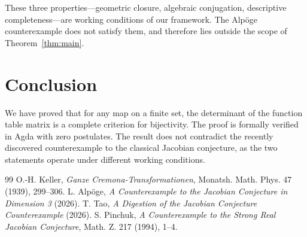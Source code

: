 \documentclass[a4paper,11pt]{article}
\theoremstyle{definition}
\theoremstyle{remark}
\begin{document}
These three properties---geometric closure, algebraic conjugation,
descriptive completeness---are working conditions of our framework.
The Alp\"{o}ge counterexample does not satisfy them, and therefore
lies outside the scope of Theorem~\ref{thm:main}.

\section{Conclusion}

We have proved that for any map on a finite set, the determinant of the
function table matrix is a complete criterion for bijectivity. The proof
is formally verified in Agda with zero postulates. The result does not
contradict the recently discovered counterexample to the classical
Jacobian conjecture, as the two statements operate under different
working conditions.

\begin{thebibliography}{99}
 O.-H. Keller, \textit{Ganze Cremona-Transformationen}, Monatsh. Math. Phys. 47 (1939), 299--306.
 L. Alp\"{o}ge, \textit{A Counterexample to the Jacobian Conjecture in Dimension 3} (2026).
 T. Tao, \textit{A Digestion of the Jacobian Conjecture Counterexample} (2026).
 S. Pinchuk, \textit{A Counterexample to the Strong Real Jacobian Conjecture}, Math. Z. 217 (1994), 1--4.
\end{thebibliography}
\end{document}
